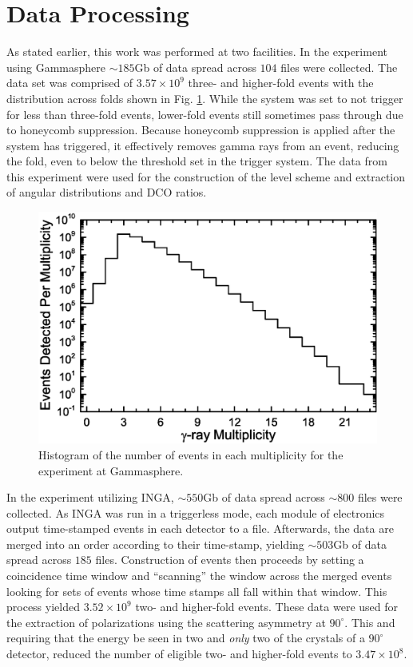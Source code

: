 \section{Data Processing}
\label{sec:exp-pr-data-proc}
 As stated earlier, this work was performed at two facilities. In the experiment using Gammasphere $\sim{}185$Gb of data spread across $104$ files were collected. The data set was comprised of $3.57\times{}10^9$ three- and higher-fold events with the distribution across folds shown in Fig. \ref{fig:chp3-gs_event_pattern}. While the system was set to not trigger for less than three-fold events, lower-fold events still sometimes pass through due to honeycomb suppression. Because honeycomb suppression is applied after the system has triggered, it effectively removes gamma rays from an event, reducing the fold, even to below the threshold set in the trigger system. The data from this experiment were used for the construction of the level scheme and extraction of angular distributions and DCO ratios.
 
\begin{figure}[h!]
	\centerline{\includegraphics[height=0.25\textheight]{./img/c3/gs_event_plot.eps}}
	\caption{Histogram of the number of events in each multiplicity for the experiment at Gammasphere.\label{fig:chp3-gs_event_pattern}}
\end{figure}
 
In the experiment utilizing INGA, $\sim{}550$Gb of data spread across $\sim800$ files were collected. As INGA was run in a triggerless mode, each module of electronics output time-stamped events in each detector to a file. Afterwards, the data are merged into an order according to their time-stamp, yielding $\sim{}503$Gb of data spread across $185$ files. Construction of events then proceeds by setting a coincidence time window and ``scanning'' the window across the merged events looking for sets of events whose time stamps all fall within that window. This process yielded $3.52\times{}10^9$ two- and higher-fold events. These data were used for the extraction of polarizations using the scattering asymmetry at $90^{\circ{}}$. This and requiring that the energy be seen in two and \emph{only} two of the crystals of a $90^{\circ{}}$ detector, reduced the number of eligible two- and higher-fold events to $3.47\times{}10^8$.
 
